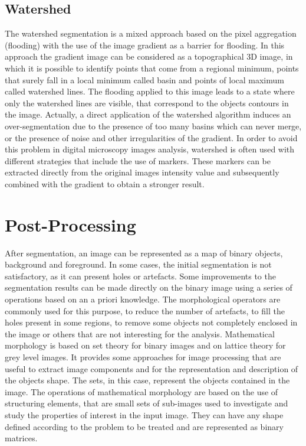 \documentclass[final,a4paper,12pt,english]{UnicaPhdThesis3}
\begin{document}
	\subsection{Watershed} \label{watershed} %
	The watershed segmentation \cite{Meyer} is a mixed approach based on the pixel aggregation (flooding) with the use of the image gradient as a barrier for flooding. In this approach the gradient image can be considered as a topographical 3D image, in which it is possible to identify points that come from a regional minimum, points that surely fall in a local minimum called basin and points of local maximum called watershed lines. The flooding applied to this image leads to a state where only the watershed lines are visible, that correspond to the objects contours in the image. Actually, a direct application of the watershed algorithm induces an over-segmentation due to the presence of too many basins which can never merge, or the presence of noise and other irregularities of the gradient. In order to avoid this problem in digital microscopy images analysis, watershed is often used with different strategies that include the use of markers. These markers can be extracted directly from the original images intensity value and subsequently combined with the gradient to obtain a stronger result.
	
	\section{Post-Processing} \label{postp}
	After segmentation, an image can be represented as a map of binary objects, background and foreground. In some cases, the initial segmentation is not satisfactory, as it can present holes or artefacts. Some improvements to the segmentation results can be made directly on the binary image using a series of operations based on an a priori knowledge. The morphological operators are commonly used for this purpose, to reduce the number of artefacts, to fill the holes present in some regions, to remove some objects not completely enclosed in the image or others that are not interesting for the analysis. Mathematical morphology is based on set theory for binary images \cite{Serra, Serra2} and on lattice theory for grey level images. It provides some approaches for image processing that are useful to extract image components and for the representation and description of the objects shape. The sets, in this case, represent the objects contained in the image. The operations of mathematical morphology are based on the use of structuring elements, that are small sets of sub-images used to investigate and study the properties of interest in the input image. They can have any shape defined according to the problem to be treated and are represented as binary matrices.
	
\end{document}
